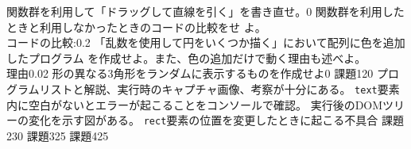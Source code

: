 \documentclass[a4j]{jreport}
\begin{document}
 {
 {\Must 関数群を利用して「ドラッグして直線を引く」を書き直せ。}{0}
 {\Must 関数群を利用したときと利用しなかったときのコードの比較をせ
 よ。\\コードの比較:}{0.2}
 {「乱数を使用して円をいくつか描く」において配列に色を追加したプログラム
 を作成せよ。また、色の追加だけで動く理由も述べよ。\\理由}{0.02}
 {形の異なる3角形をランダムに表示するものを作成せよ}{0}
 }
{}
{{課題1}{20}
{
  {プログラムリストと解説、実行時のキャプチャ画像、考察が十分にある。
  \ResultA}
  {\texttt{text}要素内に空白がないとエラーが起こることをコンソールで確認。
  \ResultFI}
  {実行後のDOMツリーの変化を示す図がある。\ResultFI}
  {\texttt{rect}要素の位置を変更したときに起こる不具合}
}
{
  {}
}
{
  {}
}
 {課題2}{30}
 {
   {}
 }
 {
   {}
 }
 {
   {}
 }
 {課題3}{25}
 {
   {}
 }
 {
   {}
 }
 {
   {}
 }
 {課題4}{25}
 {
   {}
 }
 {
   {}
 }
 {
   {}
 }
}
\end{document}
